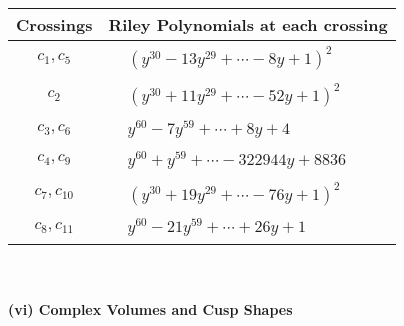 \documentclass[1p]{elsarticle_modified}
\theoremstyle{definition}
\begin{document}
\begin{tabular}{m{50pt}|m{274pt}}
Crossings & \hspace{64pt}Riley Polynomials at each crossing \\
\hline $$\begin{aligned}c_{1},c_{5}\end{aligned}$$&$\begin{aligned}
&(y^{30}-13 y^{29}+\cdots-8 y+1)^{2}
\end{aligned}$\\
\hline $$\begin{aligned}c_{2}\end{aligned}$$&$\begin{aligned}
&(y^{30}+11 y^{29}+\cdots-52 y+1)^{2}
\end{aligned}$\\
\hline $$\begin{aligned}c_{3},c_{6}\end{aligned}$$&$\begin{aligned}
&y^{60}-7 y^{59}+\cdots+8 y+4
\end{aligned}$\\
\hline $$\begin{aligned}c_{4},c_{9}\end{aligned}$$&$\begin{aligned}
&y^{60}+y^{59}+\cdots-322944 y+8836
\end{aligned}$\\
\hline $$\begin{aligned}c_{7},c_{10}\end{aligned}$$&$\begin{aligned}
&(y^{30}+19 y^{29}+\cdots-76 y+1)^{2}
\end{aligned}$\\
\hline $$\begin{aligned}c_{8},c_{11}\end{aligned}$$&$\begin{aligned}
&y^{60}-21 y^{59}+\cdots+26 y+1
\end{aligned}$\\
\hline
\end{tabular}\\~\\
\newpage\flushleft \textbf{(vi) Complex Volumes and Cusp Shapes}
\end{document}
